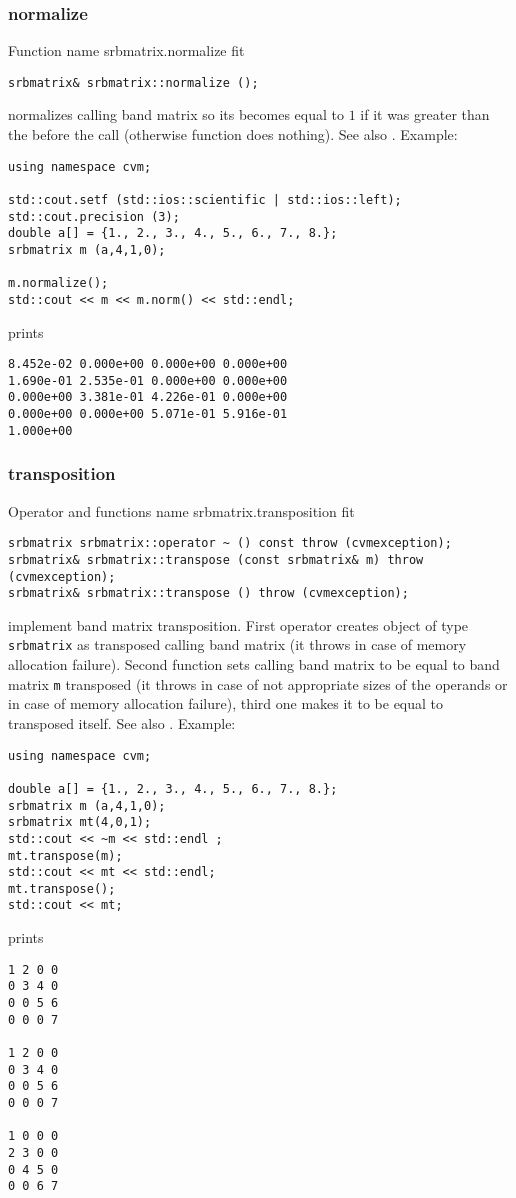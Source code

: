 \subsubsection{normalize}
Function%
\pdfdest name {srbmatrix.normalize} fit
\begin{verbatim}
srbmatrix& srbmatrix::normalize ();
\end{verbatim}
normalizes  calling band matrix so its 
becomes equal to $1$ if it was greater than the 
before the call (otherwise function does nothing).
See also .
Example:
\begin{Verbatim}
using namespace cvm;

std::cout.setf (std::ios::scientific | std::ios::left); 
std::cout.precision (3);
double a[] = {1., 2., 3., 4., 5., 6., 7., 8.};
srbmatrix m (a,4,1,0);

m.normalize();
std::cout << m << m.norm() << std::endl;
\end{Verbatim}
prints
\begin{Verbatim}
8.452e-02 0.000e+00 0.000e+00 0.000e+00
1.690e-01 2.535e-01 0.000e+00 0.000e+00
0.000e+00 3.381e-01 4.226e-01 0.000e+00
0.000e+00 0.000e+00 5.071e-01 5.916e-01
1.000e+00
\end{Verbatim}
\newpage


\subsubsection{transposition}
Operator and functions%
\pdfdest name {srbmatrix.transposition} fit
\begin{verbatim}
srbmatrix srbmatrix::operator ~ () const throw (cvmexception);
srbmatrix& srbmatrix::transpose (const srbmatrix& m) throw (cvmexception);
srbmatrix& srbmatrix::transpose () throw (cvmexception);
\end{verbatim}
implement band matrix transposition.
First operator creates  object of type \verb"srbmatrix" as
 transposed calling band matrix
(it throws  
in case of memory allocation failure). 
Second function sets calling band matrix to be 
equal to  band matrix
\verb"m" transposed
(it throws  
in case of not appropriate sizes of the operands or
in case of memory allocation failure), 
third one makes it to be equal to
transposed itself. 
See also .
Example:
\begin{Verbatim}
using namespace cvm;

double a[] = {1., 2., 3., 4., 5., 6., 7., 8.};
srbmatrix m (a,4,1,0);
srbmatrix mt(4,0,1);
std::cout << ~m << std::endl ;
mt.transpose(m);
std::cout << mt << std::endl;
mt.transpose();
std::cout << mt;
\end{Verbatim}
prints
\begin{Verbatim}
1 2 0 0
0 3 4 0
0 0 5 6
0 0 0 7

1 2 0 0
0 3 4 0
0 0 5 6
0 0 0 7

1 0 0 0
2 3 0 0
0 4 5 0
0 0 6 7
\end{Verbatim}
\newpage




